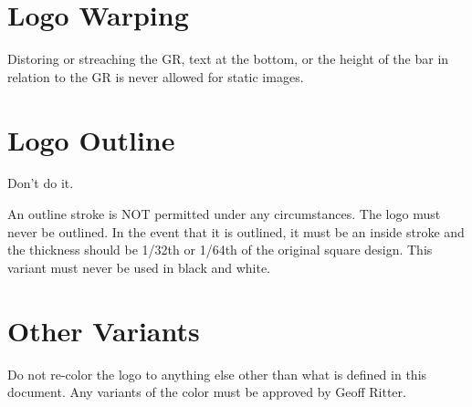 \documentclass{logo_styleguide}
\begin{document}
\section{Logo Warping}
Distoring or streaching the GR, text at the bottom, or the height of the bar in relation to the GR is never allowed for static images.


\section{Logo Outline}
Don't do it.

An outline stroke is NOT permitted under any circumstances. The logo must never be outlined. In the event that it is outlined, it must be an inside stroke and the thickness should be 1/32th or 1/64th of the original square design. This variant must never be used in black and white.

\section{Other Variants}
Do not re-color the logo to anything else other than what is defined in this document. Any variants of the color must be approved by Geoff Ritter.
\end{document}
